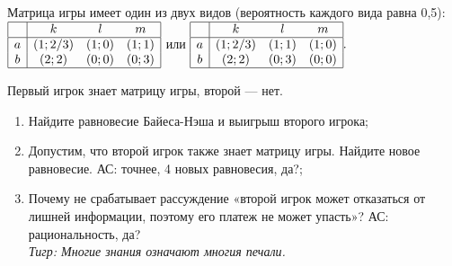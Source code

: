 \begin{problem}
Матрица игры имеет один из двух видов (вероятность каждого вида равна 0,5):
 $\begin{array}{|c|ccc|}  \hline {} & {k} & {l} & {m} \\  \hline {a} & {\left(1;{2\mathord{\left/ {\vphantom {2 3}} \right. \kern-\nulldelimiterspace} 3} \right)} & {\left(1;0\right)} & {\left(1;1\right)} \\ {b} & {\left(2;2\right)} & {\left(0;0\right)} & {\left(0;3\right)} \\  \hline  \end{array}$  или  $\begin{array}{|c|ccc|}  \hline {} & {k} & {l} & {m} \\  \hline {a} & {\left(1;{2\mathord{\left/ {\vphantom {2 3}} \right. \kern-\nulldelimiterspace} 3} \right)} & {\left(1;1\right)} & {\left(1;0\right)} \\ {b} & {\left(2;2\right)} & {\left(0;3\right)} & {\left(0;0\right)} \\  \hline  \end{array}.$

 Первый игрок знает матрицу игры, второй — нет.
 \begin{enumerate}
\item      Найдите равновесие Байеса-Нэша и выигрыш второго игрока;\\
\item      Допустим, что второй игрок также знает матрицу игры. Найдите новое равновесие. {\red АС: точнее, 4 новых равновесия, да?};\\
\item       Почему не срабатывает рассуждение «второй игрок может отказаться от лишней информации,  поэтому его платеж не может упасть»? {\red АС: рациональность, да?}\\
{\it Тигр: Многие знания означают многи{\red я} печали.}
\end{enumerate}


\begin{sol}

\end{sol}
\end{problem}









